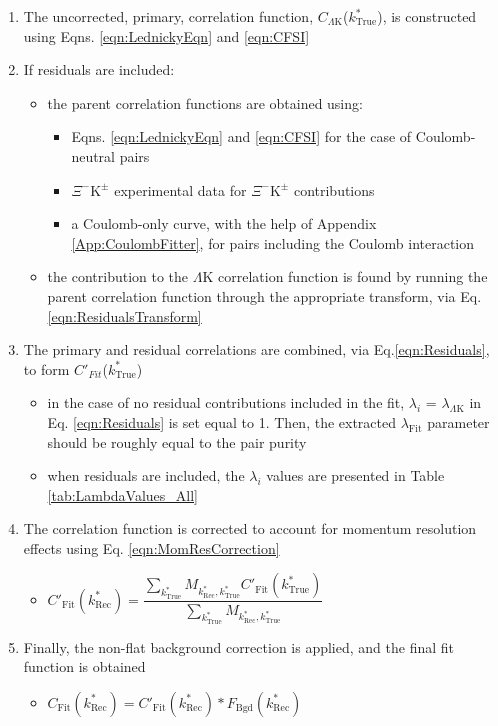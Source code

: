 \documentclass[ALICE,manyauthors]{cernphprep}
\newcommand{\ktrue}{$k^{*}_{\mathrm{True}}$\xspace}
\newcommand{\LamK}{$\Lambda$K\xspace}
\newcommand{\XiKpm}{$\Xi^{-}\mathrm{K^{\pm}}$\xspace}
\begin{document}
\begin{enumerate}
 \item The uncorrected, primary, correlation function, $C_{\Lambda\mathrm{K}}$(\ktrue), is constructed using Eqns. \ref{eqn:LednickyEqn} and \ref{eqn:CFSI}
 \item If residuals are included:
 \begin{itemize}
  \item the parent correlation functions are obtained using:
  \begin{itemize}
   \item Eqns. \ref{eqn:LednickyEqn} and \ref{eqn:CFSI} for the case of Coulomb-neutral pairs
   \item \XiKpm experimental data for \XiKpm contributions
   \item a Coulomb-only curve, with the help of Appendix \ref{App:CoulombFitter}, for pairs including the Coulomb interaction 
  \end{itemize} 
 \item the contribution to the \LamK correlation function is found by running the parent correlation function through the appropriate transform, via Eq.\ref{eqn:ResidualsTransform} 
 \end{itemize} 
 \item The primary and residual correlations are combined, via Eq.\ref{eqn:Residuals}, to form $C'_{Fit}$(\ktrue)
 \begin{itemize}
  \item in the case of no residual contributions included in the fit, $\lambda_{i}$ = $\lambda_{\Lambda\mathrm{K}}$ in Eq. \ref{eqn:Residuals} is set equal to 1.  Then, the extracted $\lambda_{\mathrm{Fit}}$ parameter should be roughly equal to the pair purity
  \item when residuals are included, the $\lambda_{i}$ values are presented in Table \ref{tab:LambdaValues_All}
 \end{itemize} 
 \item The correlation function is corrected to account for momentum resolution effects using Eq. \ref{eqn:MomResCorrection}
 \begin{itemize}
  \item $C'_{\mathrm{Fit}}(k^{*}_{\mathrm{Rec}}) = \dfrac{\sum\limits_{k^{*}_{\mathrm{True}}}M_{k^{*}_{\mathrm{Rec}},k^{*}_{\mathrm{True}}}C'_{\mathrm{Fit}}(k^{*}_{\mathrm{True}})}{\sum\limits_{k^{*}_{\mathrm{True}}}M_{k^{*}_{\mathrm{Rec}},k^{*}_{\mathrm{True}}}}$
 \end{itemize}
 \item Finally, the non-flat background correction is applied, and the final fit function is obtained
 \begin{itemize}
  \item $C_{\mathrm{Fit}}(k^{*}_{\mathrm{Rec}}) = C'_{\mathrm{Fit}}(k^{*}_{\mathrm{Rec}})*F_{\mathrm{Bgd}}(k^{*}_{\mathrm{Rec}})$
 \end{itemize}
\end{enumerate}
\end{document}
